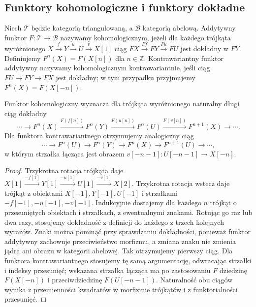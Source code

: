 \subsection{Funktory kohomologiczne i funktory dokładne}
\begin{definicja}\label{cat:def:cohomological-functor}
Niech $\mathcal T$ będzie kategorią triangulowaną, a $\mathcal B$ kategorią abelową. Addytywny funktor $F:\mathcal T\to\mathcal B$ nazywamy kohomologicznym, jeżeli dla każdego trójkąta wyróżnionego $X\xrightarrow f Y\xrightarrow u U\xrightarrow v X[1]$ ciąg $FX\xrightarrow{Ff}FY\xrightarrow{Fu}FU$ jest dokładny w $FY$. Definiujemy $F^n(X)=F(X[n])$ dla $n\in\mathbb Z$. Kontrawariantny funktor addytywny nazywamy kohomologicznym kontrawariantnie, jeśli ciąg $FU\to FY\to FX$ jest dokładny; w tym przypadku przyjmujemy $F^n(X)=F(X[-n])$.
\end{definicja}
\begin{stwierdzenie}\label{cat:prop:cohomological-les}
Funktor kohomologiczny wyznacza dla trójkąta wyróżnionego naturalny długi ciąg dokładny
\[
 \cdots\to F^n(X)\xrightarrow{F(f[n])}F^n(Y)
 \xrightarrow{F(u[n])}F^n(U)
 \xrightarrow{F(v[n])}F^{n+1}(X)\to\cdots.
\]
Dla funktora kontrawariantnego otrzymujemy analogiczny ciąg
\[
 \cdots\to F^n(U)\to F^n(Y)\to F^n(X)
 \to F^{n+1}(U)\to\cdots,
\]
w którym strzałka łącząca jest obrazem $v[-n-1]:U[-n-1]\to X[-n]$.
\end{stwierdzenie}
\begin{proof}
Trzykrotna rotacja trójkąta daje $X[1]\xrightarrow{-f[1]}Y[1]\xrightarrow{-u[1]}U[1]\xrightarrow{-v[1]}X[2]$. Trzykrotna rotacja wstecz daje trójkąt z obiektami $X[-1],Y[-1],U[-1]$ i strzałkami $-f[-1],-u[-1],-v[-1]$. Indukcyjnie dostajemy dla każdego $n$ trójkąt o przesuniętych obiektach i strzałkach, z ewentualnymi znakami. Rotując go raz lub dwa razy, stosujemy dokładność z definicji do każdego z trzech kolejnych wyrazów. Znaki można pominąć przy sprawdzaniu dokładności, ponieważ funktor addytywny zachowuje przeciwieństwo morfizmu, a zmiana znaku nie zmienia jądra ani obrazu w kategorii abelowej. Tak otrzymujemy pierwszy ciąg. Dla funktora kontrawariantnego stosujemy tę samą argumentację, odwracając strzałki i indeksy przesunięć; wskazana strzałka łącząca ma po zastosowaniu $F$ dziedzinę $F(X[-n])$ i przeciwdziedzinę $F(U[-n-1])$. Naturalność obu ciągów wynika z przemienności kwadratów w morfizmie trójkątów i z funktorialności przesunięć.
\end{proof}
